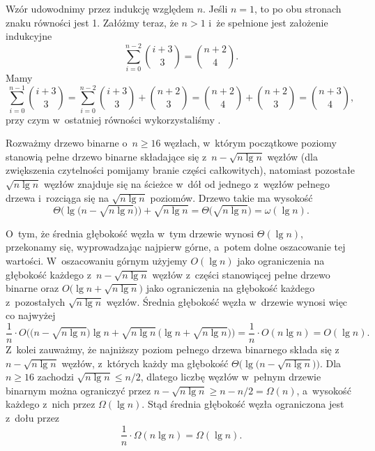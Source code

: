 
\exercise %
Wzór udowodnimy przez indukcję względem $n$.
Jeśli $n=1$, to po obu stronach znaku równości jest 1.
Załóżmy teraz, że $n>1$ i~że spełnione jest założenie indukcyjne
\[
	\sum_{i=0}^{n-2}\binom{i+3}{3} = \binom{n+2}{4}.
\]
Mamy
\[
	\sum_{i=0}^{n-1}\binom{i+3}{3} = \sum_{i=0}^{n-2}\binom{i+3}{3}+\binom{n+2}{3} = \binom{n+2}{4}+\binom{n+2}{3} = \binom{n+3}{4},
\]
przy czym w~ostatniej równości wykorzystaliśmy .

\exercise %
Rozważmy drzewo binarne o~$n\ge16$ węzłach, w~którym początkowe poziomy stanowią pełne drzewo binarne składające się z~$n-\sqrt{n\lg n}$ węzłów (dla zwiększenia czytelności pomijamy branie części całkowitych), natomiast pozostałe $\sqrt{n\lg n}$ węzłów znajduje się na ścieżce w~dół od jednego z~węzłów pełnego drzewa i~rozciąga się na $\sqrt{n\lg n}$ poziomów.
Drzewo takie ma wysokość
\[
	\Theta\bigl(\lg\bigl(n-\sqrt{n\lg n}\bigr)\bigr)+\sqrt{n\lg n} = \Theta\bigl(\!\sqrt{n\lg n}\bigr) = \omega(\lg n).
\]

O~tym, że średnia głębokość węzła w~tym drzewie wynosi $\Theta(\lg n)$, przekonamy się, wyprowadzając najpierw górne, a~potem dolne oszacowanie tej wartości.
W~oszacowaniu górnym użyjemy $O(\lg n)$ jako ograniczenia na głębokość każdego z~$n-\sqrt{n\lg n}$ węzłów z~części stanowiącej pełne drzewo binarne oraz $O\bigl(\lg n+\sqrt{n\lg n}\bigr)$ jako ograniczenia na głębokość każdego z~pozostałych $\sqrt{n\lg n}$ węzłów.
Średnia głębokość węzła w~drzewie wynosi więc co najwyżej
\[
	\frac{1}{n}\cdot O\bigl(\bigl(n-\sqrt{n\lg n}\bigr)\lg n+\sqrt{n\lg n}\,\bigl(\lg n+\sqrt{n\lg n}\bigr)\bigr) = \frac{1}{n}\cdot O(n\lg n) = O(\lg n).
\]
Z~kolei zauważmy, że najniższy poziom pełnego drzewa binarnego składa się z~$n-\sqrt{n\lg n}$ węzłów, z~których każdy ma głębokość $\Theta\bigl(\lg\bigl(n-\sqrt{n\lg n}\bigr)\bigr)$.
Dla $n\ge16$ zachodzi $\sqrt{n\lg n}\le n/2$, dlatego liczbę węzłów w~pełnym drzewie binarnym można ograniczyć przez $n-\sqrt{n\lg n}\ge n-n/2=\Omega(n)$, a~wysokość każdego z~nich przez $\Omega(\lg n)$.
Stąd średnia głębokość węzła ograniczona jest z~dołu przez
\[
	\frac{1}{n}\cdot\Omega(n\lg n) = \Omega(\lg n).
\]

